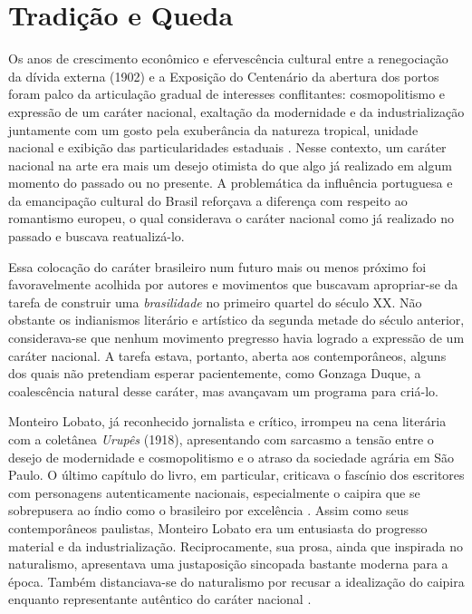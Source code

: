 \hypertarget{tradiuxe7uxe3o-e-queda}{%
\section{Tradição e Queda}\label{tradiuxe7uxe3o-e-queda}}

Os anos de crescimento econômico e efervescência cultural entre a
renegociação da dívida externa (1902) e a Exposição do Centenário da
abertura dos portos foram palco da articulação gradual de interesses
conflitantes: cosmopolitismo e expressão de um caráter nacional,
exaltação da modernidade e da industrialização juntamente com um gosto
pela exuberância da natureza tropical, unidade nacional e exibição das
particularidades estaduais \autocite{pereira:2011exposicao}. Nesse
contexto, um caráter nacional na arte era mais um desejo otimista do que
algo já realizado em algum momento do passado ou no presente. A
problemática da influência portuguesa e da emancipação cultural do
Brasil reforçava a diferença com respeito ao romantismo europeu, o qual
considerava o caráter nacional como já realizado no passado e buscava
reatualizá-lo.

Essa colocação do caráter brasileiro num futuro mais ou menos próximo
foi favoravelmente acolhida por autores e movimentos que buscavam
apropriar-se da tarefa de construir uma \emph{brasilidade} no primeiro
quartel do século XX. Não obstante os indianismos literário e artístico
da segunda metade do século anterior, considerava-se que nenhum
movimento pregresso havia logrado a expressão de um caráter nacional. A
tarefa estava, portanto, aberta aos contemporâneos, alguns dos quais não
pretendiam esperar pacientemente, como Gonzaga Duque, a coalescência
natural desse caráter, mas avançavam um programa para criá-lo.

Monteiro Lobato, já reconhecido jornalista e crítico, irrompeu na cena
literária com a coletânea \emph{Urupês} (1918), apresentando com
sarcasmo a tensão entre o desejo de modernidade e cosmopolitismo e o
atraso da sociedade agrária em São Paulo. O último capítulo do livro, em
particular, criticava o fascínio dos escritores com personagens
autenticamente nacionais, especialmente o caipira que se sobrepusera ao
índio como o brasileiro por excelência
\autocite[p.~208--209]{monteirolobato:1944urupes}. Assim como seus
contemporâneos paulistas, Monteiro Lobato era um entusiasta do progresso
material e da industrialização. Reciprocamente, sua prosa, ainda que
inspirada no naturalismo, apresentava uma justaposição sincopada
bastante moderna para a época. Também distanciava-se do naturalismo por
recusar a idealização do caipira enquanto representante autêntico do
caráter nacional \autocite[p.~303]{silva:2013modernidade}.


